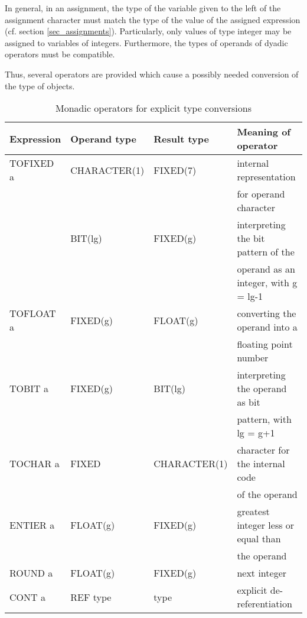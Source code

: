 In general, in an assignment, the type of the variable given to the left
of the assignment character must match the type of the value of the
assigned expression (cf. section \ref{sec_assignments}).
 Particularly, only values of type
integer may be assigned to variables of integers. Furthermore, the types
of operands of dyadic operators must be compatible.

Thus, several operators are provided which cause a possibly needed
conversion of the type of objects.

\begin{table} %
\begin{center}
\caption{Monadic operators for explicit type conversions}
\label{tab_monadic_type}
\vspace{5mm}
\begin{tabular}{|l|l|l|l|}
\hline
{\bf Expression} & {\bf Operand type} & {\bf Result type} & {\bf Meaning of operator}\\ \hline

TOFIXED a        & CHARACTER(1)      & FIXED(7)         & internal representation\\
                &                   &                   & for operand character\\ \cline{2-4}
                     
                 & BIT(lg)           & FIXED(g)         & interpreting the bit pattern of the\\
                 &                   &                  & operand as an integer, with g = lg-1\\ \hline

TOFLOAT a        & FIXED(g)          & FLOAT(g)         & converting the operand into a\\
                 &                   &                  & floating point number\\ \hline
    
TOBIT a          & FIXED(g)          & BIT(lg)          & interpreting the operand as bit\\
                 &                   &                  & pattern, with lg = g+1\\ \hline

TOCHAR a         & FIXED             & CHARACTER(1)     & character for the internal code\\
                 &                   &                  & of the operand\\ \hline

ENTIER a         & FLOAT(g)          & FIXED(g)         & greatest integer less or equal than\\
                 &                   &                  & the operand\\ \hline
 
ROUND a          & FLOAT(g)          & FIXED(g)         & next integer \\ \hline

CONT a           & REF type          & type             & explicit de-referentiation\\
\hline
\end{tabular}  
\end{center} 
\end{table}

